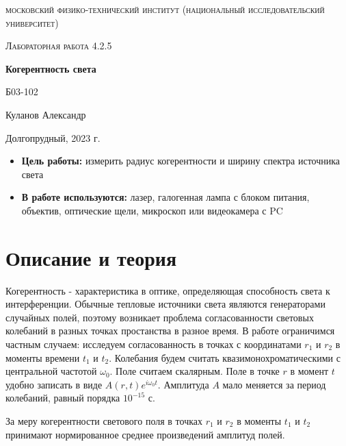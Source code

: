 \documentclass[a4paper, 12pt]{article}
\begin{document}
\begin{titlepage}
	\centering
	\vspace{5cm}
	{\scshape\LARGE московский физико-технический институт (национальный исследовательский университет) \par}
	\vspace{6cm}
	{\scshape\Large Лабораторная работа 4.2.5 \par}
	{\huge\bfseries Когерентность света \par}
	\vspace{1cm}
	\vfill
\begin{flushright}
	{\large Б03-102}\par
	\vspace{0.3cm}
	{\LARGE Куланов Александр}
\end{flushright}
	

	\vfill


	Долгопрудный, 2023 г.
\end{titlepage}

\begin{itemize}
	\item \textbf{Цель работы:} измерить радиус когерентности и ширину спектра источника света
    \item \textbf{В работе используются:} лазер, галогенная лампа с блоком питания, объектив, оптические щели, микроскоп или видеокамера с PC
\end{itemize}

\section{Описание и теория}

Когерентность - характеристика в оптике, определяющая способность света к интерференции. Обычные тепловые источники света являются генераторами случайных полей, поэтому возникает проблема
согласованности световых колебаний в разных точках простанства в разное время. В работе ограничимся частным случаем: исследуем согласованность в точках с координатами $r_1$ и $r_2$ в
моменты времени $t_1$ и $t_2$. Колебания будем считать квазимонохроматическими с центральной частотой $\omega_0$. Поле считаем скалярным. Поле в точке $r$ в момент $t$ удобно записать 
в виде $A(r, t)e^{i\omega_0 t}$. Амплитуда $A$ мало меняется за период колебаний, равный порядка $10^{-15}$ с.

За меру когерентности светового поля в точках $r_1$ и $r_2$ в моменты $t_1$ и $t_2$ принимают нормированное среднее произведений амплитуд полей.
\end{document}
